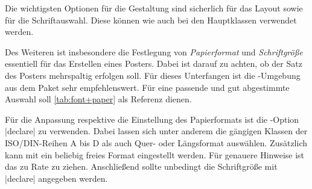 \begin{Bundle*}[v2.05]{}
Die wichtigsten Optionen für die Gestaltung sind sicherlich 
 für das Layout sowie  für die Schriftauswahl. Diese 
können wie auch bei den Hauptklassen verwendet werden. 

Des Weiteren ist insbesondere die Festlegung von \emph{Papierformat} und 
\emph{Schriftgröße} essentiell für das Erstellen eines Posters. 
Dabei ist darauf zu achten, ob der Satz des Posters mehrspaltig erfolgen soll. 
Für dieses Unterfangen ist die -Umgebung aus dem Paket 
 sehr empfehlenswert. Für eine passende und gut abgestimmte 
Auswahl soll \autoref{tab:font+paper} als Referenz dienen.

Für die Anpassung respektive die Einstellung des Papierformats ist die 
\KOMAScript-Option |declare| zu verwenden. Dabei 
lassen sich unter anderem die gängigen Klassen der ISO/DIN-Reihen A bis D als 
auch Quer- oder Längsformat auswählen. Zusätzlich kann mit  
ein beliebig freies Format eingestellt werden. Für genauere Hinweise ist das 
\scrguide zu Rate zu ziehen. Anschließend sollte unbedingt die Schriftgröße 
mit |declare| angegeben werden. 


\end{Bundle*}

